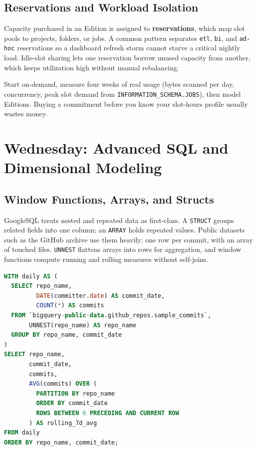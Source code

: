 \subsection{Reservations and Workload Isolation}
Capacity purchased in an Edition is assigned to \textbf{reservations}, which map slot pools to projects, folders, or jobs. A common pattern separates \texttt{etl}, \texttt{bi}, and \texttt{ad-hoc} reservations so a dashboard refresh storm cannot starve a critical nightly load. Idle-slot sharing lets one reservation borrow unused capacity from another, which keeps utilization high without manual rebalancing.

\begin{tipbox}
Start on-demand, measure four weeks of real usage (bytes scanned per day, concurrency, peak slot demand from \texttt{INFORMATION\_SCHEMA.JOBS}), then model Editions. Buying a commitment before you know your slot-hours profile usually wastes money.
\end{tipbox}

\section{Wednesday: Advanced SQL and Dimensional Modeling}

\subsection{Window Functions, Arrays, and Structs}
GoogleSQL treats nested and repeated data as first-class. A \texttt{STRUCT} groups related fields into one column; an \texttt{ARRAY} holds repeated values. Public datasets such as the GitHub archive use them heavily: one row per commit, with an array of touched files. \texttt{UNNEST} flattens arrays into rows for aggregation, and window functions compute running and rolling measures without self-joins.

\begin{lstlisting}[language=SQL,caption={Seven-day rolling average of daily commits per repository with window functions.}]
WITH daily AS (
  SELECT repo_name,
         DATE(committer.date) AS commit_date,
         COUNT(*) AS commits
  FROM `bigquery-public-data.github_repos.sample_commits`,
       UNNEST(repo_name) AS repo_name
  GROUP BY repo_name, commit_date
)
SELECT repo_name,
       commit_date,
       commits,
       AVG(commits) OVER (
         PARTITION BY repo_name
         ORDER BY commit_date
         ROWS BETWEEN 6 PRECEDING AND CURRENT ROW
       ) AS rolling_7d_avg
FROM daily
ORDER BY repo_name, commit_date;
\end{lstlisting}

